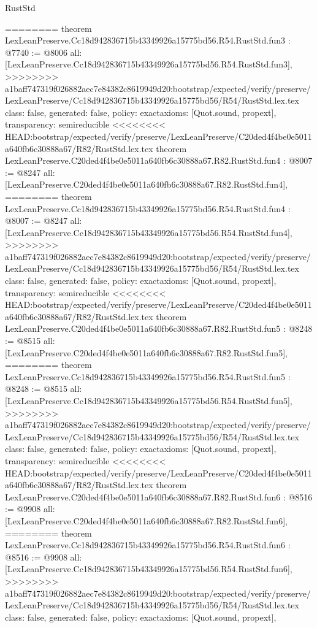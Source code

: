 \begin{lexlean}{RustStd}
\begin{coremodule}
{\begin{coremodule}
{{{{{{========
theorem LexLeanPreserve.Cc18d942836715b43349926a15775bd56.R54.RustStd.fun3 : @7740 := @8006 {
  all: [LexLeanPreserve.Cc18d942836715b43349926a15775bd56.R54.RustStd.fun3],
>>>>>>>> a1baff747319f026882aec7e84382c8619949d20:bootstrap/expected/verify/preserve/LexLeanPreserve/Cc18d942836715b43349926a15775bd56/R54/RustStd.lex.tex
  class: false,
  generated: false,
  policy: exact{axioms: [Quot.sound, propext]},
  transparency: semireducible
}
<<<<<<<< HEAD:bootstrap/expected/verify/preserve/LexLeanPreserve/C20ded4f4be0e5011a640fb6c30888a67/R82/RustStd.lex.tex
theorem LexLeanPreserve.C20ded4f4be0e5011a640fb6c30888a67.R82.RustStd.fun4 : @8007 := @8247 {
  all: [LexLeanPreserve.C20ded4f4be0e5011a640fb6c30888a67.R82.RustStd.fun4],
========
theorem LexLeanPreserve.Cc18d942836715b43349926a15775bd56.R54.RustStd.fun4 : @8007 := @8247 {
  all: [LexLeanPreserve.Cc18d942836715b43349926a15775bd56.R54.RustStd.fun4],
>>>>>>>> a1baff747319f026882aec7e84382c8619949d20:bootstrap/expected/verify/preserve/LexLeanPreserve/Cc18d942836715b43349926a15775bd56/R54/RustStd.lex.tex
  class: false,
  generated: false,
  policy: exact{axioms: [Quot.sound, propext]},
  transparency: semireducible
}
<<<<<<<< HEAD:bootstrap/expected/verify/preserve/LexLeanPreserve/C20ded4f4be0e5011a640fb6c30888a67/R82/RustStd.lex.tex
theorem LexLeanPreserve.C20ded4f4be0e5011a640fb6c30888a67.R82.RustStd.fun5 : @8248 := @8515 {
  all: [LexLeanPreserve.C20ded4f4be0e5011a640fb6c30888a67.R82.RustStd.fun5],
========
theorem LexLeanPreserve.Cc18d942836715b43349926a15775bd56.R54.RustStd.fun5 : @8248 := @8515 {
  all: [LexLeanPreserve.Cc18d942836715b43349926a15775bd56.R54.RustStd.fun5],
>>>>>>>> a1baff747319f026882aec7e84382c8619949d20:bootstrap/expected/verify/preserve/LexLeanPreserve/Cc18d942836715b43349926a15775bd56/R54/RustStd.lex.tex
  class: false,
  generated: false,
  policy: exact{axioms: [Quot.sound, propext]},
  transparency: semireducible
}
<<<<<<<< HEAD:bootstrap/expected/verify/preserve/LexLeanPreserve/C20ded4f4be0e5011a640fb6c30888a67/R82/RustStd.lex.tex
theorem LexLeanPreserve.C20ded4f4be0e5011a640fb6c30888a67.R82.RustStd.fun6 : @8516 := @9908 {
  all: [LexLeanPreserve.C20ded4f4be0e5011a640fb6c30888a67.R82.RustStd.fun6],
========
theorem LexLeanPreserve.Cc18d942836715b43349926a15775bd56.R54.RustStd.fun6 : @8516 := @9908 {
  all: [LexLeanPreserve.Cc18d942836715b43349926a15775bd56.R54.RustStd.fun6],
>>>>>>>> a1baff747319f026882aec7e84382c8619949d20:bootstrap/expected/verify/preserve/LexLeanPreserve/Cc18d942836715b43349926a15775bd56/R54/RustStd.lex.tex
  class: false,
  generated: false,
  policy: exact{axioms: [Quot.sound, propext]},
}}}}}}}}}}
\end{coremodule}}
\end{coremodule}
\end{lexlean}
